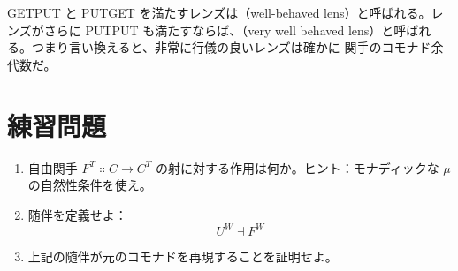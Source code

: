 GETPUT と PUTGET を満たすレンズは（well-behaved lens）と呼ばれる。レンズがさらに PUTPUT も満たすならば、（very well behaved lens）と呼ばれる。つまり言い換えると、非常に行儀の良いレンズは確かに  関手のコモナド余代数だ。

\section{練習問題}

\begin{enumerate}
  \tightlist
  \item
        自由関手 $F^T \Colon C \to C^T$ の射に対する作用は何か。ヒント：モナディックな $\mu$ の自然性条件を使え。
  \item
        随伴を定義せよ：
        \[U^W \dashv F^W\]
  \item
        上記の随伴が元のコモナドを再現することを証明せよ。
\end{enumerate}
